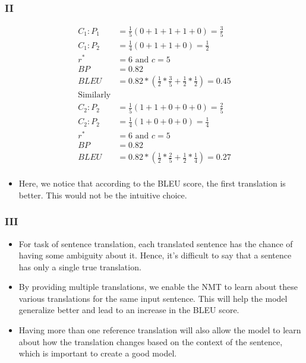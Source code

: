 \documentclass[a4paper]{article}
\begin{document}
\subsubsection{II}
\begin{equation}
\begin{split}
    C_1:  P_1 &= \frac{1}{5} (0 + 1 + 1 + 1 + 0) = \frac{3}{5} \\
    C_1:  P_2 &= \frac{1}{4} (0 + 1 + 1 + 0) = \frac{1}{2}\\
    r^* &= 6  \text{ and } c = 5 \\
    BP &= 0.82 \\
    BLEU &= 0.82 * ( \frac{1}{2} * \frac{3}{5} + \frac{1}{2} * \frac{1}{2}) = 0.45 \\
    \text{Similarly} \\
    C_2:  P_2 &= \frac{1}{5} (1 + 1 + 0 + 0 + 0) = \frac{2}{5} \\
    C_2:  P_2 &= \frac{1}{4} (1 + 0 + 0 + 0) = \frac{1}{4}\\
    r^* &= 6  \text{ and } c = 5 \\
    BP &= 0.82 \\
    BLEU &= 0.82 * ( \frac{1}{2} * \frac{2}{5} + \frac{1}{2} * \frac{1}{4}) = 0.27 \\
\end{split}
\end{equation}
\begin{itemize}
    \item Here, we notice that according to the BLEU score, the first translation is better. This would not be the intuitive choice.
\end{itemize}
\subsubsection{III}
\begin{itemize}
    \item For task of sentence translation, each translated sentence has the chance of having some ambiguity about it. Hence, it's difficult to say that a sentence has only a single true translation.
    \item By providing multiple translations, we enable the NMT to learn about these various translations for the same input sentence. This will help the model generalize better and lead to an increase in the BLEU score.
    \item Having more than one reference translation will also allow the model to learn about how the translation changes based on the context of the sentence, which is important to create a good model.
\end{itemize}
\end{document}
